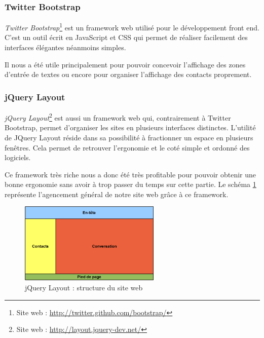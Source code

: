 \subsubsection{Twitter Bootstrap}

\textit{Twitter Bootstrap}\footnote{Site web : \href{http://twitter.github.com/bootstrap/}{http://twitter.github.com/bootstrap/}} est un framework web utilisé pour le développement front end.
C'est un outil écrit en JavaScript et CSS qui permet de réaliser facilement des interfaces élégantes néanmoins simples. 

Il nous a été utile principalement pour pouvoir concevoir l'affichage des zones d'entrée de textes ou 
encore pour organiser l'affichage des contacts proprement.


\subsubsection{jQuery Layout}

\textit{jQuery Layout}\footnote{Site web : \href{http://layout.jquery-dev.net/}{http://layout.jquery-dev.net/}} est aussi un framework web qui, contrairement à Twitter Bootstrap, permet d'organiser les sites en plusieurs interfaces distinctes. 
L'utilité de JQuery Layout réside dans sa possibilité à fractionner un espace en plusieurs fenêtres.
Cela permet de retrouver l'ergonomie et le coté simple et ordonné des logiciels. 

Ce framework très riche nous a donc été très profitable pour pouvoir obtenir une bonne ergonomie sans avoir
à trop passer du temps sur cette partie.
Le schéma \ref{siteWeb_jQueryLayout} représente l'agencement général de notre site web grâce à ce framework.

\begin{figure}[!h]
	\center
	\includegraphics[width=0.6\textwidth]{img/siteWeb_jQueryLayout.png}
	\caption{jQuery Layout : structure du site web}
	\label{siteWeb_jQueryLayout}
\end{figure}
